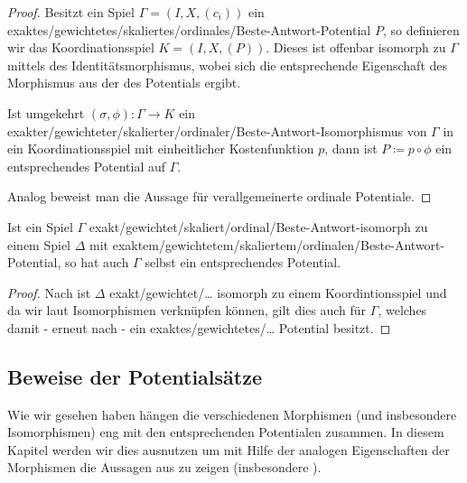\begin{proof}
	Besitzt ein Spiel $\Gamma= (I, X, (c_i))$ ein exaktes/gewichtetes/skaliertes/ordinales/Beste-Antwort-Potential $P$, so definieren wir das Koordinationsspiel $K = (I, X, (P))$. Dieses ist offenbar isomorph zu $\Gamma$ mittels des Identitätsmorphismus, wobei sich die entsprechende Eigenschaft des Morphismus aus der des Potentials ergibt.
	
	Ist umgekehrt $(\sigma, \phi): \Gamma \to K$ ein exakter/gewichteter/skalierter/ordinaler/Beste-Antwort-Isomorphismus von $\Gamma$ in ein Koordinationsspiel mit einheitlicher Kostenfunktion $p$, dann ist $P \coloneqq p \circ \phi$ ein entsprechendes Potential auf $\Gamma$.
	
	Analog beweist man die Aussage für verallgemeinerte ordinale Potentiale.
\end{proof}

\begin{kor}\label{kor:PotentialeDurchIsosUebertragen}
	Ist ein Spiel $\Gamma$ exakt/gewichtet/skaliert/ordinal/Beste-Antwort-isomorph zu einem Spiel $\Delta$ mit exaktem/gewichtetem/skaliertem/ordinalen/Beste-Antwort-Potential, so hat auch $\Gamma$ selbst ein entsprechendes Potential.
\end{kor}

\begin{proof}
	Nach  ist $\Delta$ exakt/gewichtet/\dots{} isomorph zu einem Koordintionsspiel und da wir laut  Isomorphismen verknüpfen können, gilt dies auch für $\Gamma$, welches damit - erneut nach  - ein exaktes/gewichtetes/\dots{} Potential besitzt.
\end{proof}


\subsection{Beweise der Potentialsätze}\label{sec:Morphismen:Potentialsaetze}

Wie wir gesehen haben hängen die verschiedenen Morphismen (und insbesondere Isomorphismen) eng mit den entsprechenden Potentialen zusammen. In diesem Kapitel werden wir dies ausnutzen um mit Hilfe der analogen Eigenschaften der Morphismen die Aussagen aus  zu zeigen (insbesondere ).

